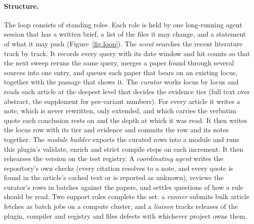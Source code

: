\paragraph{Structure.} The loop consists of standing roles. Each role is held
by one long-running agent session that has a written brief, a list of the
files it may change, and a statement of what it may push
(Figure~\ref{fig:loop}). The \emph{scout} searches the recent literature track
by track. It records every query with its date window and hit counts so that
the next sweep reruns the same query, merges a paper found through several
sources into one entry, and queues each paper that bears on an existing locus,
together with the passage that shows it. The \emph{curator} works locus by
locus and reads each article at the deepest level that decides the evidence
tier (full text over abstract, the supplement for per-variant numbers). For
every article it writes a note, which is never rewritten, only extended, and
which carries the verbatim quote each conclusion rests on and the depth at
which it was read. It then writes the locus row with its tier and evidence and
commits the row and its notes together. The \emph{module builder} exports the
curated rows into a module and runs this plugin's validate, enrich and strict
compile steps on each increment. It then rehearses the version on the test
registry. A \emph{coordinating agent} writes the repository's own checks
(every citation resolves to a note, and every quote is found in the article's
cached text or is reported as unknown), reviews the curator's rows in batches
against the papers, and settles questions of how a rule should be read. Two
support roles complete the set: a \emph{runner} submits bulk article fetches
as batch jobs on a compute cluster, and a \emph{liaison} tracks releases of
the plugin, compiler and registry and files defects with whichever project
owns them.


